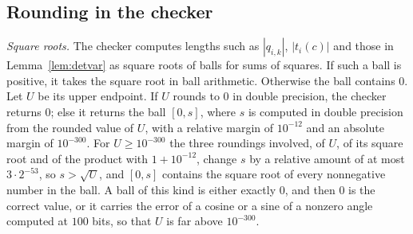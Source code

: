 \documentclass[11pt]{amsart}
\theoremstyle{definition}
\theoremstyle{remark}
\numberwithin{equation}{section}
\begin{document}
\subsection{Rounding in the checker}\label{app:rounding}

\emph{Square roots.} The checker computes lengths such as $|q_{i,k}|$, $|t_i(c)|$ and those in Lemma~\ref{lem:detvar} as square roots of balls for sums of squares. If such a ball is positive, it takes the square root in ball arithmetic. Otherwise the ball contains $0$. Let $U$ be its upper endpoint. If $U$ rounds to $0$ in double precision, the checker returns $0$; else it returns the ball $[0,s]$, where $s$ is computed in double precision from the rounded value of $U$, with a relative margin of $10^{-12}$ and an absolute margin of $10^{-300}$. For $U\ge10^{-300}$ the three roundings involved, of $U$, of its square root and of the product with $1+10^{-12}$, change $s$ by a relative amount of at most $3\cdot2^{-53}$, so $s>\sqrt U$, and $[0,s]$ contains the square root of every nonnegative number in the ball. A ball of this kind is either exactly $0$, and then $0$ is the correct value, or it carries the error of a cosine or a sine of a nonzero angle computed at $100$ bits, so that $U$ is far above $10^{-300}$.
\end{document}
